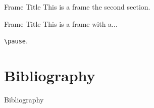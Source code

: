 \documentclass{beamer}
\begin{document}
    \begin{frame}{Frame Title}
        This is a frame the second section.
    \end{frame}

    \begin{frame}{Frame Title}
        This is a frame with a...

        \pause

        \texttt{\textbackslash pause}.
    \end{frame}

\section{Bibliography}
\nocite{einstein, knuthwebsite, latexcompanion}
\begin{frame}{Bibliography}


\end{frame}
\end{document}
